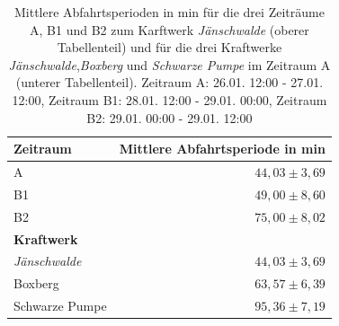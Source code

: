\begin{table}[!ht]
	\centering
	\caption{Mittlere Abfahrtsperioden in min für die drei Zeiträume A, B1 und B2 zum Karftwerk \emph{Jänschwalde} (oberer Tabellenteil) und für die drei Kraftwerke \emph{Jänschwalde},\emph{Boxberg} und \emph{Schwarze Pumpe} im Zeitraum A (unterer Tabellenteil). Zeitraum A: 26.01. 12:00 - 27.01. 12:00, Zeitraum B1: 28.01. 12:00 - 29.01. 00:00, Zeitraum B2: 29.01. 00:00 - 29.01. 12:00}
	\label{tab:results}
	\begin{tabular}{|l|r|}
		\hline
		\textbf{Zeitraum} & \textbf{Mittlere Abfahrtsperiode in min} \\
		\hline
		\hline
		A & $44,03 \pm 3,69$\\
		\hline
		B1 & $49,00 \pm 8,60$\\
		\hline
        B2 & $75,00 \pm 8,02$\\
		\hline
		\hline
        \textbf{Kraftwerk} & \\
		\hline
		\hline
        \emph{Jänschwalde} & $44,03 \pm 3,69$\\
		\hline
        Boxberg & $63,57 \pm 6,39$\\
		\hline
		Schwarze Pumpe & $95,36 \pm 7,19$\\
		\hline
	\end{tabular}
\end{table}